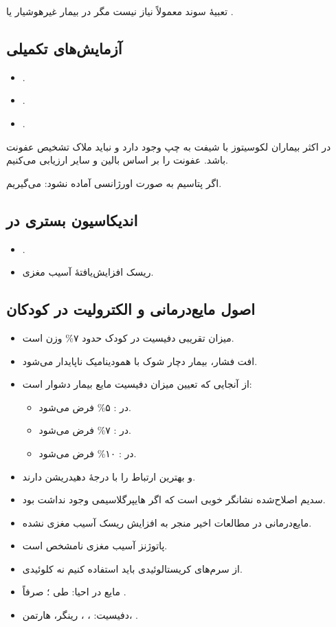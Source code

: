 \documentclass[12pt,a4paper]{article}
\begin{document}
تعبیهٔ سوند معمولاً نیاز نیست مگر در بیمار غیرهوشیار یا .
\subsection*{آزمایش‌های تکمیلی}
\begin{itemize}
\item {}.
\item {}.
\item {}.
\end{itemize}
در اکثر بیماران  لکوسیتوز با شیفت به چپ وجود دارد و نباید ملاک تشخیص عفونت باشد. عفونت را بر اساس بالین و سایر ارزیابی می‌کنیم.

اگر پتاسیم به صورت اورژانسی آماده نشود:  می‌گیریم.
\subsection*{اندیکاسیون بستری در }
\begin{itemize}
\item {}.
\item ریسک افزایش‌یافتهٔ آسیب مغزی.
\end{itemize}
\subsection*{اصول مایع‌درمانی و الکترولیت در  کودکان}
\begin{itemize}
\item میزان تقریبی دفیسیت در کودک حدود ۷\% وزن است.
\item افت فشار،  بیمار دچار شوک با همودینامیک ناپایدار می‌شود.
\item از آنجایی که تعیین میزان دفیسیت مایع بیمار دشوار است:
\begin{itemize}
\item در : ۵\% فرض می‌شود.
\item در : ۷\% فرض می‌شود.
\item در : ۱۰\% فرض می‌شود.
\end{itemize}
\item {} و  بهترین ارتباط را با درجهٔ دهیدریشن دارند.
\item سدیم اصلاح‌شده نشانگر خوبی است که اگر هایپرگلاسیمی وجود نداشت بود. 
\item مایع‌درمانی در مطالعات اخیر منجر به افزایش ریسک آسیب مغزی نشده.
\item پاتوژنز آسیب مغزی نامشخص است.
\item از سرم‌های کریستالوئیدی باید استفاده کنیم نه کلوئیدی.
\item مایع در احیا:  طی ؛ صرفاً .
\item دفیسیت: ، ، رینگر، هارتمن، .
\end{itemize}
\end{document}
